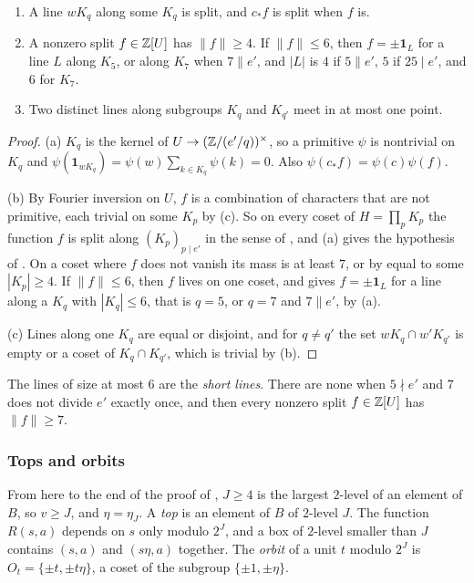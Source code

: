 \begin{lemma}\label{lem:splitsmall}
\begin{enumerate}[label=\textup{(\alph*)}]
\item A line $wK_{q}$ along some $K_{q}$ is split, and $c_{*}f$ is split
when $f$ is.
\item A nonzero split $f\in\mathbb{Z}[U]$ has $\|f\|\ge4$. If $\|f\|\le6$, then
$f=\pm\mathbf 1_{L}$ for a line $L$ along $K_{5}$, or along $K_{7}$ when
$7\parallel e'$, and $|L|$ is $4$ if $5\parallel e'$, $5$ if $25\mid e'$,
and $6$ for $K_{7}$.
\item Two distinct lines along subgroups $K_{q}$ and $K_{q'}$ meet in at most
one point.
\end{enumerate}
\end{lemma}

\begin{proof}
(a) $K_{q}$ is the kernel of $U\to(\mathbb{Z}/(e'/q))^{\times}$, so a primitive
$\psi$ is nontrivial on $K_{q}$ and $\psi(\mathbf
1_{wK_{q}})=\psi(w)\sum_{k\in K_{q}}\psi(k)=0$. Also
$\psi(c_{*}f)=\psi(c)\psi(f)$.

(b) By Fourier inversion on $U$, $f$ is a combination of characters that are
not primitive, each trivial on some $K_{p}$ by (c). So on every
coset of $H=\prod_{p}K_{p}$ the function $f$ is split along
$(K_{p})_{p\mid e'}$ in the sense of , and (a)
gives the hypothesis of . On a coset where $f$ does not
vanish its mass is at least $7$, or by  equal to some
$|K_{p}|\ge4$. If $\|f\|\le6$, then $f$ lives on one coset, and
 gives $f=\pm\mathbf 1_{L}$ for a line along a $K_{q}$ with
$|K_{q}|\le6$, that is $q=5$, or $q=7$ and $7\parallel e'$, by
(a).

(c) Lines along one $K_{q}$ are equal or disjoint, and for $q\ne q'$ the set
$wK_{q}\cap w'K_{q'}$ is empty or a coset of $K_{q}\cap K_{q'}$, which is
trivial by (b).
\end{proof}

The lines of size at most $6$ are the \emph{short lines}. There are none
when $5\nmid e'$ and $7$ does not divide $e'$ exactly once, and then every
nonzero split $f\in\mathbb{Z}[U]$ has $\|f\|\ge7$.

\subsubsection*{Tops and orbits}
From here to the end of the proof of , $J\ge4$ is the
largest $2$-level of an element of $B$, so $v\ge J$, and $\eta=\eta_{J}$. A
\emph{top} is an element of $B$ of $2$-level $J$. The function $R(s,a)$
depends on $s$ only modulo $2^{J}$, and a box of $2$-level smaller than $J$
contains $(s,a)$ and $(s\eta,a)$ together. The \emph{orbit} of a unit $t$
modulo $2^{J}$ is $O_{t}=\{\pm t,\pm t\eta\}$, a coset of the subgroup
$\{\pm1,\pm\eta\}$.


